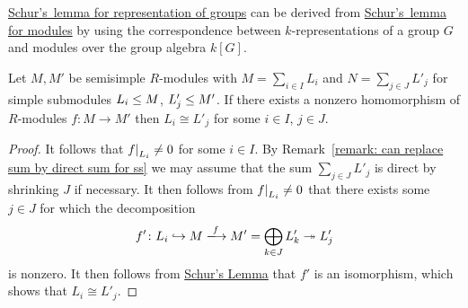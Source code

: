 \begin{remark}
  \hyperref[proposition: Schurs lemma representations]{Schur’s~lemma for representation of groups} can be derived from \hyperref[proposition: schurs lemma for modules]{Schur’s~lemma for modules} by using the correspondence between $k$-representations of a group $G$ and modules over the group algebra $k[G]$.
\end{remark}


\begin{corollary}
  \label{corollary: no nonzero homomorphisms between disjoint semisimple modules}
  Let $M, M'$ be semisimple $R$-modules with $M = \sum_{i \in I} L_i$ and $N = \sum_{j \in J} L'_j$ for simple submodules $L_i \leq M$, $L'_j \leq M'$.
  If there exists a nonzero homomorphism of $R$-modules $f \colon M \to M'$ then $L_i \cong L'_j$ for some $i \in I$, $j \in J$.
\end{corollary}


\begin{proof}
  It follows that $\restrict{f}{L_i} \neq 0$ for some $i \in I$.
  By Remark~\ref{remark: can replace sum by direct sum for ss} we may assume that the sum $\sum_{j \in J} L'_j$ is direct by shrinking $J$ if necessary.
  It then follows from $\restrict{f}{L_i} \neq 0$ that there exists some $j \in J$ for which the decomposition
    \[
                        f'
    \colon              L_i
    \inclusion          M
    \xlongrightarrow{f} M'
    =                   \bigoplus_{k \in J} L'_k
    \projection         L'_j
  \]
  is nonzero.
  It then follows from \hyperref[proposition: schurs lemma for modules]{Schur’s Lemma} that $f'$ is an isomorphism, which shows that $L_i \cong L'_j$.
\end{proof}


